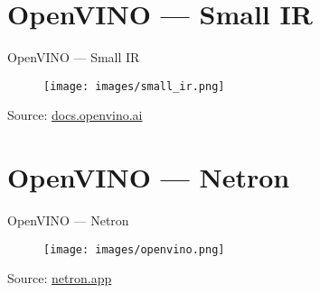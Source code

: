 \documentclass{beamer}
\begin{document}
\section{OpenVINO --- Small IR}
\begin{frame}{OpenVINO --- Small IR}
  \begin{figure}[h]
    \texttt{[image: images/small\_ir.png]}
  \end{figure}
  \footnotesize Source: \href{https://docs.openvino.ai/}{docs.openvino.ai}
\end{frame}

\section{OpenVINO --- Netron}
\begin{frame}{OpenVINO --- Netron}
  \begin{figure}[h]
    \texttt{[image: images/openvino.png]}
  \end{figure}
  \footnotesize Source: \href{https://netron.app/}{netron.app}
\end{frame}
\end{document}
